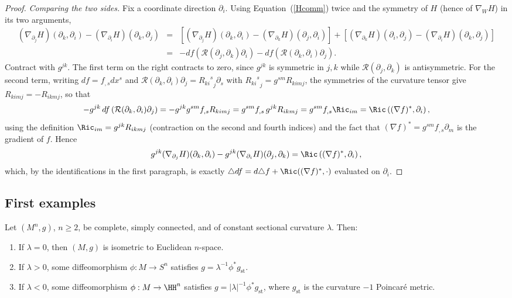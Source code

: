 \begin{proof}
\emph{Comparing the two sides.} Fix a coordinate direction
$\partial_i$. Using Equation~(\ref{Hcomm}) twice and the symmetry
of $H$ (hence of $\nabla_WH$) in its two arguments,
\begin{eqnarray*}
(\nabla_{\partial_j}H)(\partial_k,\partial_i)
-(\nabla_{\partial_i}H)(\partial_k,\partial_j)
& = & \left[(\nabla_{\partial_j}H)(\partial_k,\partial_i)
-(\nabla_{\partial_k}H)(\partial_j,\partial_i)\right]
+\left[(\nabla_{\partial_k}H)(\partial_i,\partial_j)
-(\nabla_{\partial_i}H)(\partial_k,\partial_j)\right]\\
& = & -df\left({\mathcal R}(\partial_j,\partial_k)\partial_i\right)
-df\left({\mathcal R}(\partial_k,\partial_i)\partial_j\right).
\end{eqnarray*}
Contract with $g^{jk}$. The first term on the right contracts to
zero, since $g^{jk}$ is symmetric in $j,k$ while ${\mathcal
R}(\partial_j,\partial_k)$ is antisymmetric. For the second term,
writing $df=f_{,s}dx^s$ and ${\mathcal
R}(\partial_k,\partial_i)\partial_j={{R_{ki}}^s}_j\partial_s$ with
${{R_{ki}}^s}_j=g^{sm}R_{kimj}$, the symmetries of the curvature
tensor give $R_{kimj}=-R_{ikmj}$, so that
$$-g^{jk}\,df\left({\mathcal R}(\partial_k,\partial_i)\partial_j\right)
=-g^{jk}g^{sm}f_{,s}R_{kimj}
=g^{sm}f_{,s}\,g^{jk}R_{ikmj}
=g^{sm}f_{,s}\Ric_{im}
=\Ric\left((\nabla f)^*,\partial_i\right),$$
using the definition $\Ric_{im}=g^{jk}R_{ikmj}$ (contraction on the
second and fourth indices) and the fact that $(\nabla
f)^*=g^{sm}f_{,s}\partial_m$ is the gradient of $f$. Hence
$$g^{jk}(\nabla_{\partial_j}H)(\partial_k,\partial_i)
-g^{jk}(\nabla_{\partial_i}H)(\partial_j,\partial_k)
=\Ric\left((\nabla f)^*,\partial_i\right),$$
which, by the identifications in the first paragraph, is exactly
$\triangle df=d\triangle f+\Ric((\nabla f)^*,\cdot)$ evaluated on
$\partial_i$.
\end{proof}




\subsection{First examples}

\begin{theorem}
\label{thm:uniformization}

Let $(M^n,g)$, $n\ge2$, be complete, simply connected, and of constant
sectional curvature $\lambda$. Then:
\begin{enumerate}
\item If $\lambda=0$, then $(M,g)$ is isometric to Euclidean
  $n$-space.
\item If $\lambda>0$, some diffeomorphism $\phi:M\to S^n$ satisfies
  $g=\lambda^{-1}\phi^*g_{\mathrm{st}}$.
\item If $\lambda<0$, some diffeomorphism $\phi:M\to\HH^n$ satisfies
  $g=|\lambda|^{-1}\phi^*g_{\mathrm{st}}$, where
  $g_{\mathrm{st}}$ is the curvature $-1$ Poincar\'e metric.
\end{enumerate}
\end{theorem}

